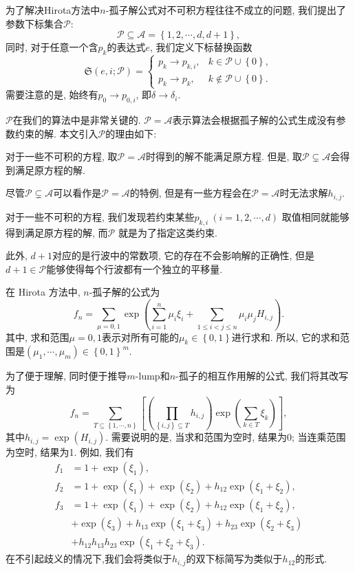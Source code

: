 \documentclass[12pt,a4paper,UTF8]{article}
\numberwithin{equation}{section}
\newcommand{\sbrace}[1]{\left(#1\right)}
\newcommand{\mbrace}[1]{\left[#1\right]}
\newcommand{\bbrace}[1]{\left\{#1\right\}}
\newcommand{\ALLP}{\mathcal{A}}
\newcommand{\PS}{\mathcal{P}}
\newcommand{\SP}{\mathfrak{S}} %
\newcommand{\MLNS}{$m$-lump和$n$-孤子的相互作用解}
\begin{document}
为了解决Hirota方法中$n$-孤子解公式对不可积方程往往不成立的问题, 我们提出了参数下标集合$\PS$: 
\begin{equation}
\PS\subseteq \ALLP=\bbrace{1,2,\cdots,d,d+1} ,
\end{equation}
同时, 对于任意一个含$p_k$的表达式$e$, 我们定义下标替换函数
\begin{equation}
\SP\sbrace{e,i;\PS}=\left\{\begin{array}{ll}
  p_k \to p_{k,i}, & k \in \PS \cup \bbrace{0},\\ 
  p_k \to p_k , & k \not\in\PS \cup \bbrace{0}.
\end{array}\right.
\end{equation}
需要注意的是, 始终有$p_0\to p_{0,i}$, 即$\delta\to \delta_i$. 

$\PS$在我们的算法中是非常关键的. $\PS= \ALLP$表示算法会根据孤子解的公式生成没有参数约束的解. 本文引入$\PS$的理由如下: 
\begin{compactenum}[1. ]
\item 对于一些不可积的方程, 取$\PS= \ALLP$时得到的解不能满足原方程. 但是, 取$\PS\subsetneq  \ALLP$会得到满足原方程的解.
\item 尽管$\PS\subsetneq  \ALLP$可以看作是$\PS= \ALLP$的特例, 但是有一些方程会在$\PS= \ALLP$时无法求解$h_{i,j}$.
\item 对于一些不可积的方程, 我们发现若约束某些$p_{k,i}~(i=1,2,\cdots,d)$ 取值相同就能够得到满足原方程的解, 而$\PS$ 就是为了指定这类约束.
\end{compactenum}

此外, $d+1$对应的是行波中的常数项, 它的存在不会影响解的正确性, 但是$d+1\in \PS$能够使得每个行波都有一个独立的平移量.

在 Hirota 方法中, $n$-孤子解的公式为 
\begin{equation}
f_n=\sum_{\mu=0,1}\exp\sbrace{\sum_{i=1}^n{\mu_i \xi_i}+\sum_{1\le i<j\le n}{\mu_i\mu_jH_{i,j}}}.
\label{soliton-old}
\end{equation}
其中, 求和范围$\mu=0,1$表示对所有可能的$\mu_k\in \bbrace{0,1}$进行求和. 所以, 它的求和范围是$\sbrace{\mu_1,\cdots,\mu_m}\in \bbrace{0,1}^m$.

为了便于理解, 同时便于推导\MLNS{}的公式, 我们将其改写为
\begin{equation}
f_n=\sum_{T\subseteq \bbrace{1,\cdots,n}}\mbrace{\sbrace{\prod_{\bbrace{i,j}\subseteq T}{h_{i,j}}}\exp\sbrace{\sum_{k\in T}{\xi_k}}}, 
\label{soliton-new}
\end{equation}
其中$h_{i,j}=\exp(H_{i,j})$. 需要说明的是, 当求和范围为空时, 结果为0; 当连乘范围为空时, 结果为1. 例如, 我们有
\begin{equation}
\begin{aligned}
f_1&=1+\exp(\xi_1) , \\ 
f_2&=1+\exp(\xi_1)+\exp(\xi_2)+h_{12}\exp(\xi_1+\xi_2) ,\\ 
f_3&=1+\exp(\xi_1)+\exp(\xi_2)+h_{12}\exp(\xi_1+\xi_2) ,\\ 
   &+\exp(\xi_3)+h_{13}\exp(\xi_1+\xi_3)+h_{23}\exp(\xi_2+\xi_3) \\
   &+h_{12}h_{13}h_{23}\exp(\xi_1+\xi_2+\xi_3) .
\end{aligned}
\end{equation}
在不引起歧义的情况下,我们会将类似于$h_{i,j}$的双下标简写为类似于$h_{12}$的形式. 
\end{document}
